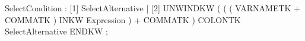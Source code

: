 %
%
%
\begin{rail}
SelectCondition : [1] SelectAlternative
                | [2] UNWINDKW ( ( ( VARNAMETK + COMMATK ) INKW Expression ) + COMMATK )
                      COLONTK SelectAlternative ENDKW
                ;
\end{rail}
